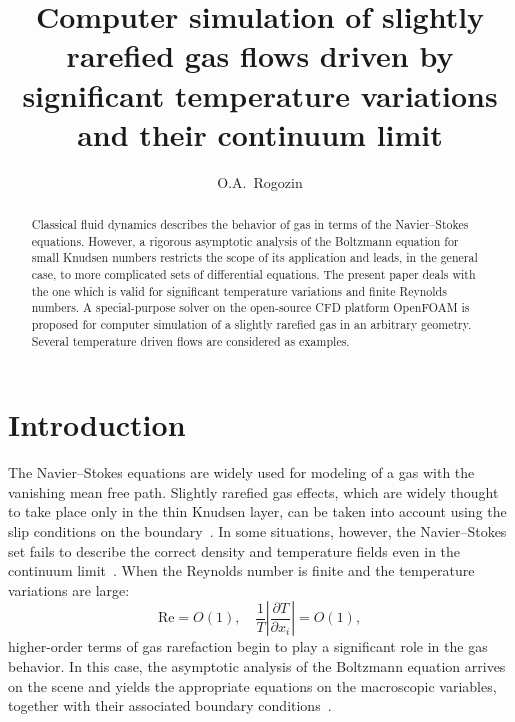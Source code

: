 \documentclass[smallextended, referee]{svjour3} %
\newcommand{\pder}[2][]{\frac{\partial#1}{\partial#2}}
\begin{document}
\title{
    Computer simulation of slightly rarefied gas flows driven by significant temperature variations and their continuum limit
}

\author{O.A.~Rogozin}

\maketitle

\begin{abstract}
    Classical fluid dynamics describes the behavior of gas in terms of the Navier--Stokes equations.
    However, a rigorous asymptotic analysis of the Boltzmann equation for small Knudsen numbers
    restricts the scope of its application and leads, in the general case,
    to more complicated sets of differential equations.
    The present paper deals with the one which is valid for significant
    temperature variations and finite Reynolds numbers.
    A special-purpose solver on the open-source CFD platform OpenFOAM\textregistered{} is proposed
    for computer simulation of a slightly rarefied gas in an arbitrary geometry.
    Several temperature driven flows are considered as examples.
\end{abstract}

\section{Introduction}

The Navier--Stokes equations are widely used for modeling of a gas with the vanishing mean free path.
Slightly rarefied gas effects, which are widely thought to take place only in the thin Knudsen layer,
can be taken into account using the slip conditions on the boundary~\cite{SharipovCoefficients}.
In some situations, however, the Navier--Stokes set fails to describe the correct density and temperature fields
even in the continuum limit~\cite{Kogan1976, SoneBobylev96}.
When the Reynolds number is finite and the temperature variations are large:
\[ \mathrm{Re} = O(1), \quad \frac1T\left|\pder[T]{x_i}\right| = O(1), \]
higher-order terms of gas rarefaction begin to play a significant role in the gas behavior.
In this case, the asymptotic analysis of the Boltzmann equation arrives on the scene and
yields the appropriate equations on the macroscopic variables, together with
their associated boundary conditions~\cite{Sone2002, Sone2007}.
\end{document}
